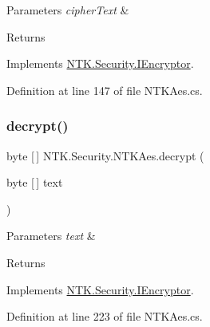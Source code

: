 \begin{DoxyParams}{Parameters}
{\em cipher\+Text} & \\
\hline
\end{DoxyParams}
\begin{DoxyReturn}{Returns}

\end{DoxyReturn}


Implements \mbox{\hyperlink{interface_n_t_k_1_1_security_1_1_i_encryptor_a036ade24943e0fe14d7dbc9637015a0f}{N\+T\+K.\+Security.\+I\+Encryptor}}.



Definition at line 147 of file N\+T\+K\+Aes.\+cs.

\mbox{\label{class_n_t_k_1_1_security_1_1_n_t_k_aes_a103d6e749268165cca16c0375497a702}} 
\subsubsection{\texorpdfstring{decrypt()}{decrypt()}\hspace{0.1cm}{\footnotesize\ttfamily [2/2]}}
{\footnotesize\ttfamily byte \mbox{[}$\,$\mbox{]} N\+T\+K.\+Security.\+N\+T\+K\+Aes.\+decrypt (\begin{DoxyParamCaption}\item[{byte \mbox{[}$\,$\mbox{]}}]{text }\end{DoxyParamCaption})}






\begin{DoxyParams}{Parameters}
{\em text} & \\
\hline
\end{DoxyParams}
\begin{DoxyReturn}{Returns}

\end{DoxyReturn}


Implements \mbox{\hyperlink{interface_n_t_k_1_1_security_1_1_i_encryptor_a90100151bcdff754395c3cc801438a1a}{N\+T\+K.\+Security.\+I\+Encryptor}}.



Definition at line 223 of file N\+T\+K\+Aes.\+cs.

\mbox{\label{class_n_t_k_1_1_security_1_1_n_t_k_aes_aafd754f5643c47dc53dfbf7d482556ce}} 
